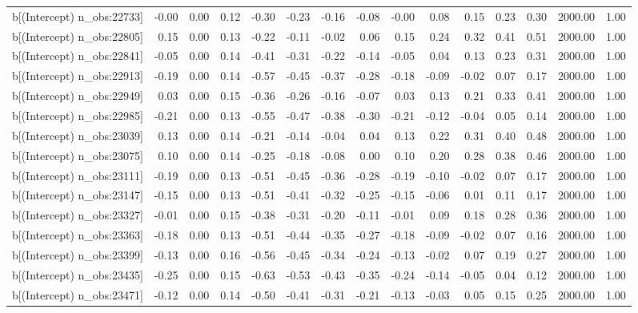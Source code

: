 \begin{table}[ht]
\begin{tabular}{rrrrrrrrrrrrrrr}
  b[(Intercept) n\_obs:22733] & -0.00 & 0.00 & 0.12 & -0.30 & -0.23 & -0.16 & -0.08 & -0.00 & 0.08 & 0.15 & 0.23 & 0.30 & 2000.00 & 1.00 \\ 
  b[(Intercept) n\_obs:22805] & 0.15 & 0.00 & 0.13 & -0.22 & -0.11 & -0.02 & 0.06 & 0.15 & 0.24 & 0.32 & 0.41 & 0.51 & 2000.00 & 1.00 \\ 
  b[(Intercept) n\_obs:22841] & -0.05 & 0.00 & 0.14 & -0.41 & -0.31 & -0.22 & -0.14 & -0.05 & 0.04 & 0.13 & 0.23 & 0.31 & 2000.00 & 1.00 \\ 
  b[(Intercept) n\_obs:22913] & -0.19 & 0.00 & 0.14 & -0.57 & -0.45 & -0.37 & -0.28 & -0.18 & -0.09 & -0.02 & 0.07 & 0.17 & 2000.00 & 1.00 \\ 
  b[(Intercept) n\_obs:22949] & 0.03 & 0.00 & 0.15 & -0.36 & -0.26 & -0.16 & -0.07 & 0.03 & 0.13 & 0.21 & 0.33 & 0.41 & 2000.00 & 1.00 \\ 
  b[(Intercept) n\_obs:22985] & -0.21 & 0.00 & 0.13 & -0.55 & -0.47 & -0.38 & -0.30 & -0.21 & -0.12 & -0.04 & 0.05 & 0.14 & 2000.00 & 1.00 \\ 
  b[(Intercept) n\_obs:23039] & 0.13 & 0.00 & 0.14 & -0.21 & -0.14 & -0.04 & 0.04 & 0.13 & 0.22 & 0.31 & 0.40 & 0.48 & 2000.00 & 1.00 \\ 
  b[(Intercept) n\_obs:23075] & 0.10 & 0.00 & 0.14 & -0.25 & -0.18 & -0.08 & 0.00 & 0.10 & 0.20 & 0.28 & 0.38 & 0.46 & 2000.00 & 1.00 \\ 
  b[(Intercept) n\_obs:23111] & -0.19 & 0.00 & 0.13 & -0.51 & -0.45 & -0.36 & -0.28 & -0.19 & -0.10 & -0.02 & 0.07 & 0.17 & 2000.00 & 1.00 \\ 
  b[(Intercept) n\_obs:23147] & -0.15 & 0.00 & 0.13 & -0.51 & -0.41 & -0.32 & -0.25 & -0.15 & -0.06 & 0.01 & 0.11 & 0.17 & 2000.00 & 1.00 \\ 
  b[(Intercept) n\_obs:23327] & -0.01 & 0.00 & 0.15 & -0.38 & -0.31 & -0.20 & -0.11 & -0.01 & 0.09 & 0.18 & 0.28 & 0.36 & 2000.00 & 1.00 \\ 
  b[(Intercept) n\_obs:23363] & -0.18 & 0.00 & 0.13 & -0.51 & -0.44 & -0.35 & -0.27 & -0.18 & -0.09 & -0.02 & 0.07 & 0.16 & 2000.00 & 1.00 \\ 
  b[(Intercept) n\_obs:23399] & -0.13 & 0.00 & 0.16 & -0.56 & -0.45 & -0.34 & -0.24 & -0.13 & -0.02 & 0.07 & 0.19 & 0.27 & 2000.00 & 1.00 \\ 
  b[(Intercept) n\_obs:23435] & -0.25 & 0.00 & 0.15 & -0.63 & -0.53 & -0.43 & -0.35 & -0.24 & -0.14 & -0.05 & 0.04 & 0.12 & 2000.00 & 1.00 \\ 
  b[(Intercept) n\_obs:23471] & -0.12 & 0.00 & 0.14 & -0.50 & -0.41 & -0.31 & -0.21 & -0.13 & -0.03 & 0.05 & 0.15 & 0.25 & 2000.00 & 1.00 \\ 

\end{tabular}
\end{table}
